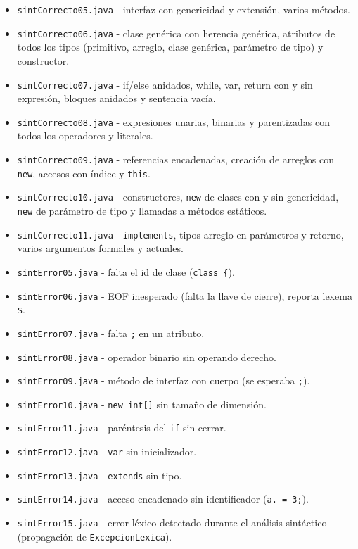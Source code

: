 \documentclass[11pt,a4paper]{article}
\begin{document}
\begin{itemize}
  \item \texttt{sintCorrecto05.java} - interfaz con genericidad y extensión, varios
        métodos.
  \item \texttt{sintCorrecto06.java} - clase genérica con herencia genérica, atributos de
        todos los tipos (primitivo, arreglo, clase genérica, parámetro de tipo) y
        constructor.
  \item \texttt{sintCorrecto07.java} - if/else anidados, while, var, return con y sin
        expresión, bloques anidados y sentencia vacía.
  \item \texttt{sintCorrecto08.java} - expresiones unarias, binarias y parentizadas con
        todos los operadores y literales.
  \item \texttt{sintCorrecto09.java} - referencias encadenadas, creación de arreglos con
        \texttt{new}, accesos con índice y \texttt{this}.
  \item \texttt{sintCorrecto10.java} - constructores, \texttt{new} de clases con y sin
        genericidad, \texttt{new} de parámetro de tipo y llamadas a métodos estáticos.
  \item \texttt{sintCorrecto11.java} - \texttt{implements}, tipos arreglo en parámetros y
        retorno, varios argumentos formales y actuales.
  \item \texttt{sintError05.java} - falta el id de clase (\verb!class {!).
  \item \texttt{sintError06.java} - EOF inesperado (falta la llave de cierre), reporta
        lexema \verb!$!.
  \item \texttt{sintError07.java} - falta \verb!;! en un atributo.
  \item \texttt{sintError08.java} - operador binario sin operando derecho.
  \item \texttt{sintError09.java} - método de interfaz con cuerpo (se esperaba \verb!;!).
  \item \texttt{sintError10.java} - \verb!new int[]! sin tamaño de dimensión.
  \item \texttt{sintError11.java} - paréntesis del \texttt{if} sin cerrar.
  \item \texttt{sintError12.java} - \texttt{var} sin inicializador.
  \item \texttt{sintError13.java} - \texttt{extends} sin tipo.
  \item \texttt{sintError14.java} - acceso encadenado sin identificador (\verb!a. = 3;!).
  \item \texttt{sintError15.java} - error léxico detectado durante el análisis
        sintáctico (propagación de \texttt{ExcepcionLexica}).
\end{itemize}
\end{document}
